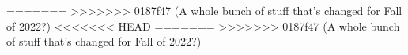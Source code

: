 \documentclass{../../oss-apphys-exam}
\begin{document}
\begin{multicols*}{2}
\begin{questions}
=======
%  
%    
>>>>>>> 0187f47 (A whole bunch of stuff that's changed for Fall of 2022?)
<<<<<<< HEAD
=======
>>>>>>> 0187f47 (A whole bunch of stuff that's changed for Fall of 2022?)


\end{questions}
\end{multicols*}
\end{document}
